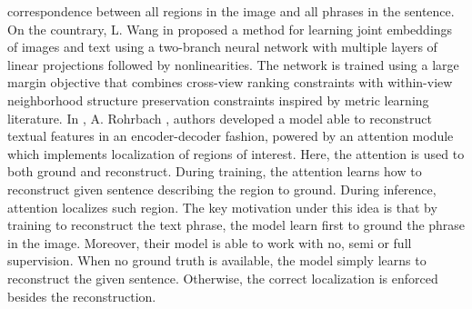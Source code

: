 correspondence between all regions in the image and all phrases in the
sentence. On the countrary, L. Wang \etal{} in \cite{wang2016learning}
proposed a method for learning joint embeddings of images and text
using a two-branch neural network with multiple layers of linear
projections followed by nonlinearities. The network is trained using a
large margin objective that combines cross-view ranking constraints
with within-view neighborhood structure preservation constraints
inspired by metric learning literature. In
\cite{rohrbach2016grounding}, A. Rohrbach \etal{}, authors developed a
model able to reconstruct textual features in an encoder-decoder
fashion, powered by an attention module which implements localization
of regions of interest. Here, the attention is used to both ground and
reconstruct. During training, the attention learns how to reconstruct
given sentence describing the region to ground. During inference,
attention localizes such region. The key motivation under this idea is
that by training to reconstruct the text phrase, the model learn first
to ground the phrase in the image. Moreover, their model is able to
work with no, semi or full supervision. When no ground truth is
available, the model simply learns to reconstruct the given sentence.
Otherwise, the correct localization is enforced besides the
reconstruction.

